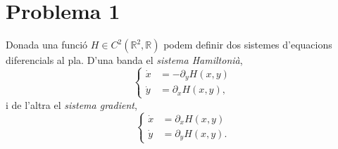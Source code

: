 \documentclass[12pt]{article}
\title{\sffamily {\bfseries Seminari 1}}
\author{\sffamily Arnau Mas}
\date{\sffamily 25 de març de 2019}
\newcommand{\R}{\mathbb{R}}
\begin{document}
\maketitle

\section*{Problema 1}
Donada una funció \( H \in C^2(\R^2, \R) \) podem definir dos sistemes d'equacions diferencials al pla. D'una banda el \emph{sistema Hamiltonià},
\begin{equation*}
	\left\{ 
		\begin{aligned}
			\dot{x} & = -\partial_y H(x,y) \\
			\dot{y} & = \partial_x H(x,y),
		\end{aligned} 
	\right. 
\end{equation*}
i de l'altra el \emph{sistema gradient}, 
\begin{equation*}
	\left\{ 
		\begin{aligned}
			\dot{x} & = \partial_x H(x,y) \\
			\dot{y} & = \partial_y H(x,y).
		\end{aligned} 
	\right. 
\end{equation*}
\end{document}
